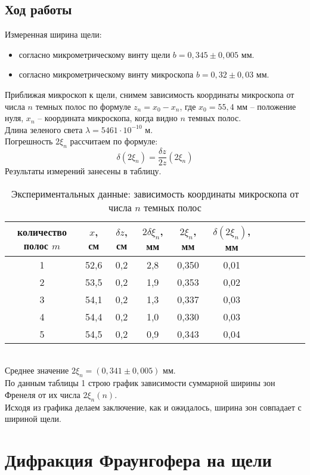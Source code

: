 \documentclass[12pt]{article}
\begin{document}
	\subsection{Ход работы}
	Измеренная ширина щели:
	\begin{itemize}
		\item согласно микрометрическому винту щели $b = 0,345 \pm 0,005$ мм.
		\item согласно микрометрическому винту микроскопа $b = 0,32 \pm 0,03$ мм.
	\end{itemize}
	Приближая микроскоп к щели, снимем зависимость координаты микроскопа от числа $n$ темных полос по формуле $z_n = x_0 - x_n$, где $x_0 = 55,4$ мм -- положение нуля, $x_n$ -- координата микроскопа, когда видно $n$ темных полос.\\
	Длина зеленого света $\lambda = 5461 \cdot 10^{-10}$ м.\\
	Погрешность $2\xi_n$ рассчитаем по формуле: \begin{equation}
	\delta(2\xi_n) = \frac{\delta z}{2z}(2\xi_n) 
	\end{equation}
	\newpage
	Результаты измерений занесены в таблицу.\\
	\begin{table}[h!]
		\begin{tabular}{||c|c|c|c|c|c||c||l|l||l|l|}
			\hline
			
			\hline
			количество полос $m$ & $x$, см&  $\delta z$, см  &  $2\delta\xi_n$, мм & $2\xi_n$, мм & $\delta(2\xi_n)$, мм \\
			\hline
			1 & 52,6 & 0,2 & 2,8 & 0,350 & 0,01 \\
			2 & 53,5 & 0,2 & 1,9 & 0,353 & 0,02\\
			3 & 54,1 & 0,2 & 1,3 & 0,337 & 0,03\\
			4 & 54,4 & 0,2 & 1,0 & 0,330 & 0,03\\
			5 & 54,5 & 0,2 & 0,9 & 0,343 & 0,04\\
			\hline
		\end{tabular}
		\caption{Экспериментальных данные: зависимость координаты микроскопа от числа $n$ темных полос}
	\end{table}
	\\
	Среднее значение $2\xi_n = (0,341 \pm 0,005)$ мм.\\
	По данным таблицы 1 строю график зависимости  суммарной ширины зон Френеля от их числа $2\xi_n(n)$. \\
	Исходя из графика делаем заключение, как и ожидалось, ширина зон совпадает с шириной щели.
	\section{Дифракция Фраунгофера на щели} 
\end{document}
